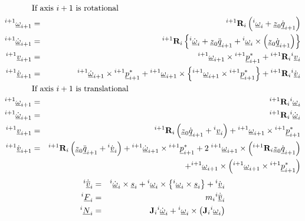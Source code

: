 \documentclass{article}
\renewcommand{\vec}[1]{\underline{#1}}
\begin{document}
\begin{eqnarray}
\lefteqn{\mbox{If axis $i+1$ is rotational}}            \nonumber       \\
\mbox{}^{i+1}\vec{\omega}_{i+1} & = &
	{}^{i+1} {\bf R}_i \left( \mbox{}^i\vec{\omega}_i + \vec{z}_0\dot{\vec{q}}_{i+1} \right)	\label{eq:rne-start}
	\\
\mbox{}^{i+1}\dot{\vec{\omega}}_{i+1}  & = &
	{}^{i+1} {\bf R}_i \left\{ \mbox{}^i\dot{\vec{\omega}}_i +
	\vec{z}_0\ddot{\vec{q}}_{i+1} +
	\mbox{}^i\vec{\omega}_i \times \left(\vec{z}_0\dot{\vec{q}}_{i+1}\right)\right\}                    \\
\mbox{}^{i+1}\vec{v}_{i+1} & = &
	\mbox{}^{i+1}\vec{\omega}_{i+1} \times  {}^{i+1}\vec{p}_{i+1}^{*} +
	{}^{i+1} {\bf R}_i \mbox{}^i\vec{v}_i
	\label{eq:v-rot}                        \\
\mbox{}^{i+1}\dot{\vec{v}}_{i+1} & = &
	\mbox{}^{i+1}\dot{\vec{\omega}}_{i+1} \times {}^{i+1}\vec{p}_{i+1}^{*} +
	\mbox{}^{i+1}\vec{\omega}_{i+1} \times \left\{
	    \mbox{}^{i+1}\vec{\omega}_{i+1} \times  {}^{i+1}\vec{p}_{i+1}^{*}
	\right\} + {}^{i+1} {\bf R}_i \mbox{}^i\dot{\vec{v}}_i
	\\
\lefteqn{\mbox{If axis $i+1$ is translational}}         \nonumber       \\
\mbox{}^{i+1}\vec{\omega}_{i+1} & = &
	{}^{i+1} {\bf R}_i \mbox{}^i\vec{\omega}_i
	\\
\mbox{}^{i+1}\dot{\vec{\omega}}_{i+1}  & = &
	{}^{i+1} {\bf R}_i  \mbox{}^i\dot{\vec{\omega}}_i
	\\
\mbox{}^{i+1}\vec{v}_{i+1} & = &
	{}^{i+1} {\bf R}_i \left(\vec{z}_0\dot{\vec{q}}_{i+1} + \mbox{}^i\vec{v}_i\right) +
	\mbox{}^{i+1}\vec{\omega}_{i+1} \times {}^{i+1}\vec{p}_{i+1}^{*}
	\label{eq:v-trans}                       \\
\mbox{}^{i+1}\dot{\vec{v}}_{i+1} & = &
	{}^{i+1} {\bf R}_i \left(\vec{z}_0 \ddot{\vec{q}}_{i+1} + \mbox{}^i\dot{\vec{v}}_i\right) +
	\mbox{}^{i+1}\dot{\vec{\omega}}_{i+1} \times {}^{i+1}\vec{p}_{i+1}^{*} +
	2\; \mbox{}^{i+1}\vec{\omega}_{i+1}  \times \left({}^{i+1} {\bf R}_i \vec{z}_0
	\dot{\vec{q}}_{i+1}\right) \nonumber \\
	&& + \mbox{}^{i+1}\vec{\omega}_{i+1} \times \left(
		\mbox{}^{i+1}\vec{\omega}_{i+1} \times {}^{i+1}\vec{p}_{i+1}^{*}\right)
\end{eqnarray}
\begin{eqnarray}
\mbox{}^i\dot{\vec{\overline{v}}}_i & = &
	\mbox{}^i\dot{\vec{\omega}}_i \times \vec{s}_i +
	\mbox{}^i\vec{\omega}_i \times \left\{
		\mbox{}^i\vec{\omega}_i \times \vec{s}_i
	\right\} +
	\mbox{}^i\dot{\vec{v}}_i \label{eq:rne-vbar}\\
\mbox{}^i\vec{F}_i & = & m_i \mbox{}^i\dot{\vec{\overline{v}}}_i \label{eq:rne-Fi}\\
\mbox{}^i\vec{N}_i & = &
	{\bf J}_i  \mbox{}^i\dot{\vec{\omega}}_i +
	\mbox{}^i\vec{\omega}_i \times \left({\bf J}_i \mbox{}^i\vec{\omega}_i\right)
\end{eqnarray}
\end{document}
